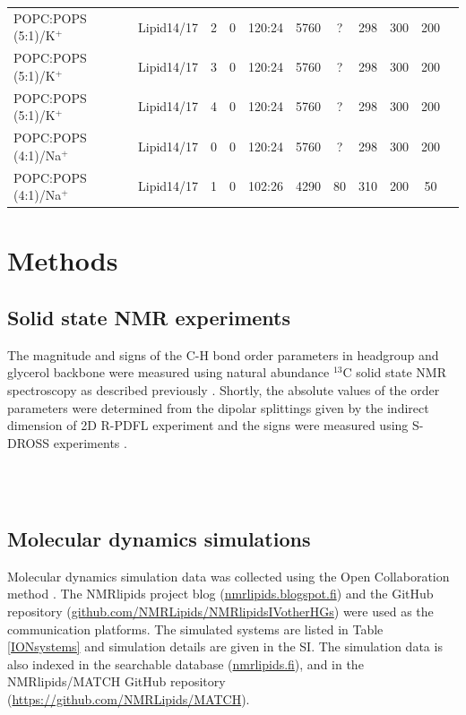 \documentclass[aps,prl,superscriptaddress,twocolumn]{revtex4}
\begin{document}
\begin{table}[!htb]
\begin{tabular}{l c c c c c c c c c c}
    POPC:POPS (5:1)/K$^+$  & Lipid14/17 \cite{dickson14,gould18} &2    & 0   & 120:24 & 5760 & ?   & 298  & 300 & 200 & \cite{POPCpopsLIPID17withK}  \\
    POPC:POPS (5:1)/K$^+$  & Lipid14/17 \cite{dickson14,gould18} &3    & 0   & 120:24 & 5760 & ?   & 298  & 300 & 200 & \cite{POPCpopsLIPID17withK}  \\
    POPC:POPS (5:1)/K$^+$  & Lipid14/17 \cite{dickson14,gould18} &4    & 0   & 120:24 & 5760 & ?   & 298  & 300 & 200 & \cite{POPCpopsLIPID17withK}  \\
    \hline
    POPC:POPS (4:1)/Na$^+$  & Lipid14/17 \cite{dickson14,gould18} &0    & 0   & 120:24 & 5760 & ?   & 298  & 300 & 200 & \cite{POPCpopsLIPID17withK}  \\
    POPC:POPS (4:1)/Na$^+$  & Lipid14/17 \cite{dickson14,gould18} &1    & 0   & 102:26 & 4290 & 80  & 310  & 200 & 50 & \cite{POPCpopsBERGERwith1000mMNa}  \\
\end{tabular}

 \end{table}

\section{Methods}

\subsection{Solid state NMR experiments}
The magnitude and signs of the C-H bond order parameters in
headgroup and glycerol backbone were measured
using natural abundance $^{13}$C solid state NMR spectroscopy as
described previously \cite{ferreira13,ferreira16}.
Shortly, the absolute values of the order parameters were determined from the dipolar splittings
given by the indirect dimension of 2D R-PDFL experiment \cite{dvinskikh04} and
the signs were measured using S-DROSS experiments \cite{gross97}.

 \\
 \\



\subsection{Molecular dynamics simulations}
Molecular dynamics simulation data was collected using
the Open Collaboration method \cite{botan15}.
The NMRlipids project blog (\url{nmrlipids.blogspot.fi}) and
the GitHub repository (\url{github.com/NMRLipids/NMRlipidsIVotherHGs})
were used as the communication platforms.
The simulated systems are listed in Table \ref{IONsystems} and
simulation details are given in the SI.
The simulation data is also indexed in the
searchable database (\url{nmrlipids.fi}),
and in the NMRlipids/MATCH GitHub repository (\url{https://github.com/NMRLipids/MATCH}).
\end{document}
